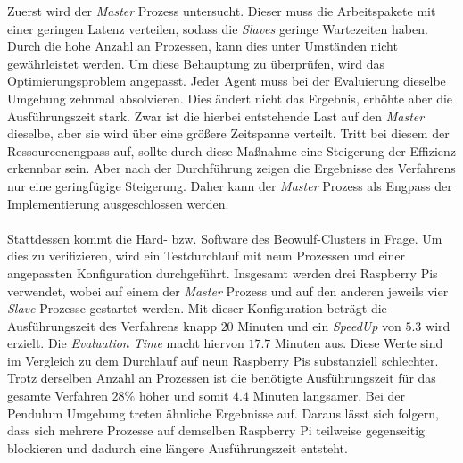 Zuerst wird der \emph{Master} Prozess untersucht. Dieser muss die Arbeitspakete mit einer geringen Latenz verteilen, sodass die \emph{Slaves} geringe Wartezeiten haben. Durch die hohe Anzahl an Prozessen, kann dies unter Umständen nicht gewährleistet werden. Um diese Behauptung zu überprüfen, wird das Optimierungsproblem angepasst. Jeder Agent muss bei der Evaluierung dieselbe Umgebung zehnmal absolvieren. Dies ändert nicht das Ergebnis, erhöhte aber die Ausführungszeit stark. Zwar ist die hierbei entstehende Last auf den \emph{Master} dieselbe, aber sie wird über eine größere Zeitspanne verteilt. Tritt bei diesem der Ressourcenengpass auf, sollte durch diese Maßnahme eine Steigerung der Effizienz erkennbar sein. Aber nach der Durchführung zeigen die Ergebnisse des Verfahrens nur eine geringfügige Steigerung. Daher kann der \emph{Master} Prozess als Engpass der Implementierung ausgeschlossen werden. 
\\\\
Stattdessen kommt die Hard- bzw. Software des Beowulf-Clusters in Frage. Um dies zu verifizieren, wird ein Testdurchlauf mit neun Prozessen und einer angepassten Konfiguration durchgeführt. Insgesamt werden drei Raspberry Pis verwendet, wobei auf einem der \emph{Master} Prozess und auf den anderen jeweils vier \emph{Slave} Prozesse gestartet werden. Mit dieser Konfiguration beträgt die Ausführungszeit des Verfahrens knapp $20$ Minuten und ein \emph{SpeedUp} von $5.3$ wird erzielt. Die \emph{Evaluation Time} macht hiervon $17.7$ Minuten aus. Diese Werte sind im Vergleich zu dem Durchlauf auf neun Raspberry Pis substanziell schlechter. Trotz derselben Anzahl an Prozessen ist die benötigte Ausführungszeit für das gesamte Verfahren $28\%$ höher und somit $4.4$ Minuten langsamer. Bei der Pendulum Umgebung treten ähnliche Ergebnisse auf. Daraus lässt sich folgern, dass sich mehrere Prozesse auf demselben Raspberry Pi teilweise gegenseitig blockieren und dadurch eine längere Ausführungszeit entsteht. 
\\\\

